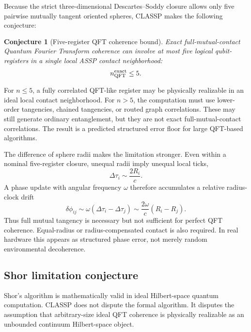 \documentclass[11pt,a4paper]{article}
\newtheorem{conjecture}{Conjecture}
\begin{document}
Because the strict three-dimensional Descartes--Soddy closure allows only five
pairwise mutually tangent oriented spheres, CLASSP makes the following
conjecture:
\begin{conjecture}[Five-register QFT coherence bound]
Exact full-mutual-contact Quantum Fourier Transform coherence can involve at
most five logical qubit-registers in a single local ASSP contact neighborhood:
\begin{equation}
  n_{\rm QFT}^{\rm exact}\leq 5.
  \label{eq:qft_five_bound}
\end{equation}
\end{conjecture}

For \(n\leq5\), a fully correlated QFT-like register may be physically
realizable in an ideal local contact neighborhood.  For \(n>5\), the
computation must use lower-order tangencies, chained tangencies, or routed
graph correlations.  These may still generate ordinary entanglement, but they
are not exact full-mutual-contact correlations.  The result is a predicted
structured error floor for large QFT-based algorithms.

The difference of sphere radii makes the limitation stronger.  Even within a
nominal five-register closure, unequal radii imply unequal local ticks,
\begin{equation}
  \Delta\tau_i\sim\frac{2R_i}{c}.
\end{equation}
A phase update with angular frequency \(\omega\) therefore accumulates a
relative radius-clock drift
\begin{equation}
  \delta\phi_{ij}
  \sim
  \omega(\Delta\tau_i-\Delta\tau_j)
  \sim
  \frac{2\omega}{c}(R_i-R_j).
  \label{eq:radius_phase_error}
\end{equation}
Thus full mutual tangency is necessary but not sufficient for perfect QFT
coherence.  Equal-radius or radius-compensated contact is also required.  In
real hardware this appears as structured phase error, not merely random
environmental decoherence.

\subsection{Shor limitation conjecture}

Shor's algorithm is mathematically valid in ideal Hilbert-space quantum
computation.  CLASSP does not dispute the formal algorithm.  It disputes the
assumption that arbitrary-size ideal QFT coherence is physically realizable as
an unbounded continuum Hilbert-space object.
\end{document}
